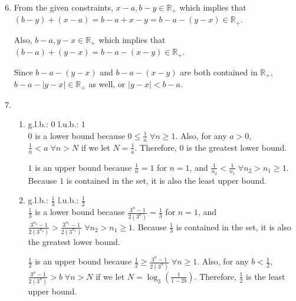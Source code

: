\documentclass[a4paper,12pt]{article}
\begin{document}
\begin{enumerate}
            \setcounter{enumi}{5}
            \item
                From the given constraints, $x - a, b - y \in \mathbb{R}_+$ which implies that $(b - y) + (x - a) = b - a + x - y = b - a - (y - x) \in \mathbb{R}_+$. \par
                Also, $b - a, y - x \in \mathbb{R}_+$ which implies that $(b - a) + (y - x) = b - a - (x - y) \in \mathbb{R}_+$. \par
                Since $b - a - (y - x)$ and $b - a - (x - y)$ are both contained in $\mathbb{R}_+$, $b - a - |y - x| \in \mathbb{R}_+$ as well, or $|y - x| < b - a$.


            \setcounter{enumi}{9}
            \item
                \begin{enumerate}
                    \item
                        g.l.b.: $0$ \space \space l.u.b.: $1$ \\
                        $0$ is a lower bound because $0 \leq \frac{1}{n} \; \forall n \geq 1$. Also, for any $a > 0$, $\frac{1}{n} < a \; \forall n > N$ if we let $N = \frac{1}{a}$. Therefore, $0$ is the greatest lower bound. \par
                      $  1$ is an upper bound because $\frac{1}{n} = 1$ for $n = 1$, and $\frac{1}{n_2} < \frac{1}{n_1} \; \forall n_2 > n_1 \geq 1$. Because $1$ is contained in the set, it is also the least upper bound.

                    \item
                        g.l.b.: $\frac{1}{3}$ \space \space l.u.b.: $\frac{1}{2}$ \\
                        $\frac{1}{3}$ is a lower bound because $\frac{3^n - 1}{2(3^n)} = \frac{1}{3}$ for $n = 1$, and $\frac{3^{n_2} - 1}{2(3^{n_2})} > \frac{3^{n_1} - 1}{2(3^{n_1})} \; \forall n_2 > n_1 \geq 1$. Because $\frac{1}{3}$ is contained in the set, it is also the greatest lower bound. \par
                        $\frac{1}{2}$ is an upper bound because $\frac{1}{2} \geq \frac{3^n - 1}{2(3^n)} \; \forall n \geq 1$. Also, for any $b < \frac{1}{2}$, $\frac{3^n - 1}{2(3^n)} > b \; \forall n > N$ if we let $N = \log_3(\frac{1}{1 - 2b})$. Therefore, $\frac{1}{2}$ is the least upper bound.


\end{enumerate}
\end{enumerate}
\end{document}
